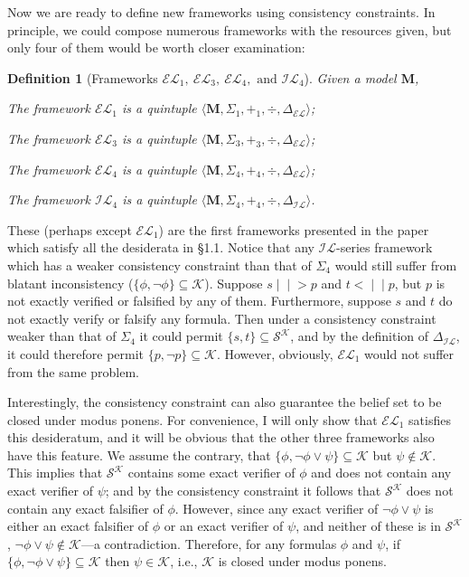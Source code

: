 \documentclass[12pt]{article}
\newtheorem{definition}{Definition}[section]
\newcommand{\inever}{\mid \! \mid \!\!>}
\newcommand{\inefal}{< \! \! \mid \! \mid}
\newcommand{\K}{\mathcal{K}}
\newcommand{\SK}{\mathcal{S}^\mathcal{K}}
\begin{document}
Now we are ready to define new frameworks using consistency constraints. In principle, we could compose numerous frameworks with the resources given, but only four of them would be worth closer examination: 
\begin{definition}[Frameworks $\mathcal{EL}_1, \ \mathcal{EL}_3, \ \mathcal{EL}_4, \text{ and } \mathcal{IL}_4$]
    Given a model $\bm{M}$, \par
     The framework $\mathcal{EL}_1$ is a quintuple $\langle \bm{M}, \Sigma_1, +_1, \div, \Delta_{\mathcal{EL}} \rangle$; \par
    The framework $\mathcal{EL}_3$ is a quintuple $\langle \bm{M}, \Sigma_3, +_3, \div, \Delta_{\mathcal{EL}} \rangle$; \par
    The framework $\mathcal{EL}_4$ is a quintuple $\langle \bm{M}, \Sigma_4, +_4, \div, \Delta_{\mathcal{EL}} \rangle$; \par
    The framework $\mathcal{IL}_4$ is a quintuple $\langle \bm{M}, \Sigma_4, +_4, \div, \Delta_{\mathcal{IL}} \rangle$.
\end{definition}
These (perhaps except $\mathcal{EL}_1$) are the first frameworks presented in the paper which satisfy all the desiderata in \S 1.1. Notice that any $\mathcal{IL}$-series framework which has a weaker consistency constraint than that of $\Sigma_4$ would still suffer from blatant inconsistency ($\{\phi, \lnot \phi\} \subseteq \K$). Suppose $s \inever p$ and $t \inefal p$, but $p$ is not exactly verified or falsified by any of them. Furthermore, suppose $s$ and $t$ do not exactly verify or falsify any formula. Then under a consistency constraint weaker than that of $\Sigma_4$ it could permit $\{s, t\} \subseteq \SK$, and by the definition of $\Delta_{\mathcal{IL}}$, it could therefore permit $\{p, \lnot p\} \subseteq \K$. However, obviously, $\mathcal{EL}_1$ would not suffer from the same problem. 
\par
Interestingly, the consistency constraint can also guarantee the belief set to be closed under modus ponens. For convenience, I will only show that $\mathcal{EL}_1$ satisfies this desideratum, and it will be obvious that the other three frameworks also have this feature. We assume the contrary, that $\{\phi, \lnot \phi \lor \psi\} \subseteq \K$ but $\psi \notin \K$. This implies that $\SK$ contains some exact verifier of $\phi$ and does not contain any exact verifier of $\psi$; and by the consistency constraint it follows that $\SK$ does not contain any exact falsifier of $\phi$. However, since any exact verifier of $\lnot \phi \lor \psi$ is either an exact falsifier of $\phi$ or an exact verifier of $\psi$, and neither of these is in $\SK$, $\lnot \phi \lor \psi \notin \K$---a contradiction. Therefore, for any formulas $\phi$ and $\psi$, if $\{ \phi, \lnot \phi \lor \psi \} \subseteq \K$ then $\psi \in \K$, i.e., $\K$ is closed under modus ponens. 
\end{document}
